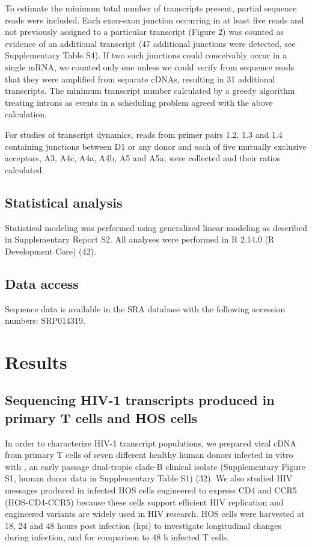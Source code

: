 \documentclass[../sherrill-Mix_thesis.tex]{subfiles}
\begin{document}
To estimate the minimum total number of transcripts present, partial sequence reads were included. Each exon-exon junction occurring in at least five reads and not previously assigned to a particular transcript (Figure 2) was counted as evidence of an additional transcript (47 additional junctions were detected, see Supplementary Table S4). If two such junctions could conceivably occur in a single mRNA, we counted only one unless we could verify from sequence reads that they were amplified from separate cDNAs, resulting in 31 additional transcripts. The minimum transcript number calculated by a greedy algorithm treating introns as events in a scheduling problem agreed with the above calculation. 

For studies of transcript dynamics, reads from primer pairs 1.2, 1.3 and 1.4 containing junctions between D1 or any donor and each of five mutually exclusive acceptors, A3, A4c, A4a, A4b, A5 and A5a, were collected and their ratios calculated. 

\subsection{Statistical analysis}
Statistical modeling was performed using generalized linear modeling as described in Supplementary Report S2. All analyses were performed in R 2.14.0 (R Development Core) (42). 

\subsection{Data access}
Sequence data is available in the SRA database with the following accession numbers: SRP014319.

\section{Results}
\subsection{Sequencing HIV-1 transcripts produced in primary T cells and HOS cells}
In order to characterize HIV-1 transcript populations, we prepared viral cDNA from primary \cdFour{} T cells of seven different healthy human donors infected in vitro with \hivEight{}, an early passage dual-tropic clade-B clinical isolate (Supplementary Figure S1, human donor data in Supplementary Table S1) (32). We also studied HIV messages produced in infected HOS cells engineered to express CD4 and CCR5 (HOS-CD4-CCR5) because these cells support efficient HIV replication and engineered variants are widely used in HIV research. HOS cells were harvested at 18, 24 and 48 hours post infection (hpi) to investigate longitudinal changes during infection, and for comparison to 48 h infected T cells.
\end{document}

